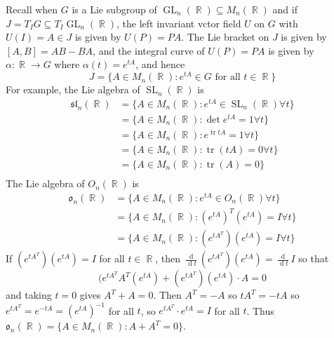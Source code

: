 \documentclass[11pt, a4paper]{memoir}
\DeclareMathOperator{\R}{{\mathbb{R}}}
\theoremstyle{change}
\theoremstyle{plain}
\theoremstyle{nonumberplain}
\DeclareMathOperator{\GL}{GL}
\DeclareMathOperator{\SL}{SL}
\DeclareMathOperator{\tr}{tr}
\newcommand{\dd}[1]{\ensuremath{\frac{\operatorname{d}}{\operatorname{d}\!#1}}}
\numberwithin{equation}{section}
\begin{document}
Recall when $G$ is a Lie subgroup of $\GL_n(\R)\subseteq M_n(\R)$ and if $J=T_IG\subseteq T_I\GL_n(\R)$, the left invariant vctor field $U$ on $G$ with $U(I)=A\in J$ is given by $U(P)=PA$.
The Lie bracket on $J$ is given by $[A,B]=AB-BA$, and the integral curve of $U(P)=PA$ is given by $\alpha:\R\to G$ where $\alpha(t)=e^{tA}$, and hence
\begin{equation*}
    J=\{A\in M_n(\R):e^{tA}\in G\text{ for all }t\in\R\}
\end{equation*}
For example, the Lie algebra of $\SL_n(\R)$ is
\begin{align*}
    \mathfrak{sl}_n(\R) &= \{A\in M_n(\R):e^{tA}\in\SL_n(\R)\forall t\}\\
                        &= \{A\in M_n(\R):\det e^{tA}=1\forall t\}\\
                        &= \{A\in M_n(\R):e^{\tr tA}=1\forall t\}\\
                        &= \{A\in M_n(\R):\tr(tA)=0\forall t\}\\
                        &= \{A\in M_n(\R):\tr(A)=0\}\\
\end{align*}
The Lie algebra of $O_n(\R)$ is
\begin{align*}
    \mathfrak{o}_n(\R) &= \{A\in M_n(\R):e^{tA}\in O_n(\R)\forall t\}\\
                       &= \{A\in M_n(\R):(e^{tA})^T(e^{tA})=I\forall t\}\\
                       &= \{A\in M_n(\R):(e^{tA^T})(e^{tA})=I\forall t\}
\end{align*}
If $(e^{tA^T})(e^{tA})=I$ for all $t\in\R$, then $\dd{t}(e^{tA^T})(e^{tA})=\dd{t}I$ so that
\begin{equation*}
    (e^{tA^T}A^T(e^{tA})+(e^{tA^T})(e^{tA})\cdot A=0
\end{equation*}
and taking $t=0$ gives $A^T+A=0$.
Then $A^T=-A$ so $tA^T=-tA$ so $e^{tA^T}=e^{-tA}=(e^{tA})^{-1}$ for all $t$, so $e^{tA^T}\cdot e^{tA}=I$ for all $t$.
Thus $\mathfrak{o}_n(\R)=\{A\in M_n(\R):A+A^T=0\}$.
\end{document}
